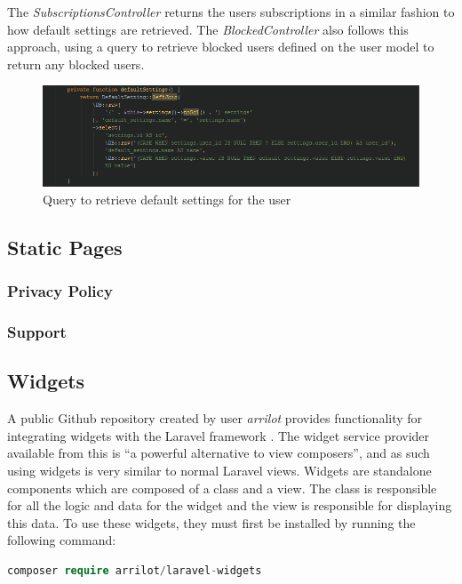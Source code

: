 The \textit{SubscriptionsController} returns the users subscriptions in a similar fashion to how default settings are retrieved. The \textit{BlockedController} also follows this approach, using a query to retrieve blocked users defined on the user model to return any blocked users.

\begin{figure}[H]
\centering
\includegraphics[width=\textwidth]{Images/Implementation/UserDefaultSettings}
\caption{Query to retrieve default settings for the user}
\label{fig:UserDefaultSettings}
\end{figure}

\subsection{Static Pages}
\subsubsection{Privacy Policy}
\subsubsection{Support}

\subsection{Widgets}
A public Github repository created by user \textit{arrilot} provides functionality for integrating widgets with the Laravel framework \cite{Packagist:LaravelWidgets}. The widget service provider available from this is ``a powerful alternative to view composers'', and as such using widgets is very similar to normal Laravel views. Widgets are standalone components which are composed of a class and a view. The class is responsible for all the logic and data for the widget and the view is responsible for displaying this data. To use these widgets, they must first be installed by running the following command:

\begin{lstlisting}[language=php]
 composer require arrilot/laravel-widgets
\end{lstlisting}

